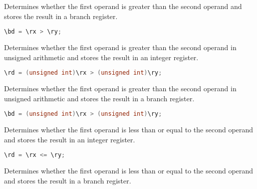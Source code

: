 Determines whether the first operand is greater than the second operand and
stores the result in a branch register.

\begin{lstlisting}[numbers=none, basicstyle=\ttfamily\footnotesize, language=C++]
\bd = \rx > \ry;
\end{lstlisting}

Determines whether the first operand is greater than the second operand in
unsigned arithmetic and stores the result in an integer register.

\begin{lstlisting}[numbers=none, basicstyle=\ttfamily\footnotesize, language=C++]
\rd = (unsigned int)\rx > (unsigned int)\ry;
\end{lstlisting}

Determines whether the first operand is greater than the second operand in
unsigned arithmetic and stores the result in a branch register.

\begin{lstlisting}[numbers=none, basicstyle=\ttfamily\footnotesize, language=C++]
\bd = (unsigned int)\rx > (unsigned int)\ry;
\end{lstlisting}

Determines whether the first operand is less than or equal to the second
operand and stores the result in an integer register.

\begin{lstlisting}[numbers=none, basicstyle=\ttfamily\footnotesize, language=C++]
\rd = \rx <= \ry;
\end{lstlisting}

Determines whether the first operand is less than or equal to the second
operand and stores the result in a branch register.

